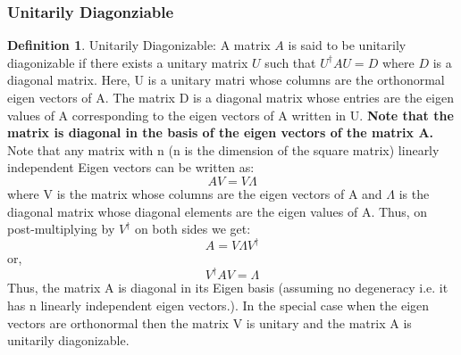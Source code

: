 \documentclass[12pt, oneside]{book}
\theoremstyle{definition}
\newtheorem{definition}{Definition}[section]
\theoremstyle{definition}
\theoremstyle{remark}
\begin{document}
\subsubsection{Unitarily Diagonziable}
\begin{definition}
Unitarily Diagonizable: A matrix $A$ is said to be unitarily diagonizable if there exists a unitary matrix $U$ such that $U^{\dagger}AU=D$ where $D$ is a diagonal matrix.
Here, U is a unitary matri whose columns are the orthonormal eigen vectors of A. The matrix D is a diagonal matrix whose entries are the eigen values of A corresponding to the 
eigen vectors of A written in U.
\textbf{Note that the matrix is diagonal in the basis of the eigen vectors of the matrix A.}
Note that any matrix with n (n is the dimension of the square matrix) linearly independent Eigen vectors can be written as:
\[ AV=V\Lambda\]
where V is the matrix whose columns are the eigen vectors of A and $\Lambda$ is the diagonal matrix whose diagonal elements are the eigen values of A.
Thus, on post-multiplying by $V^{\dagger}$ on both sides we get:
\[ A= V\Lambda V^{\dagger} \]
or,
\[ V^{\dagger}AV=\Lambda \]
Thus, the matrix A is diagonal in its Eigen basis (assuming no degeneracy i.e. it has n linearly independent eigen vectors.). 
In the special case when the eigen vectors are orthonormal then the matrix V is unitary and the matrix A is unitarily diagonizable.
\end{definition}
\end{document}
